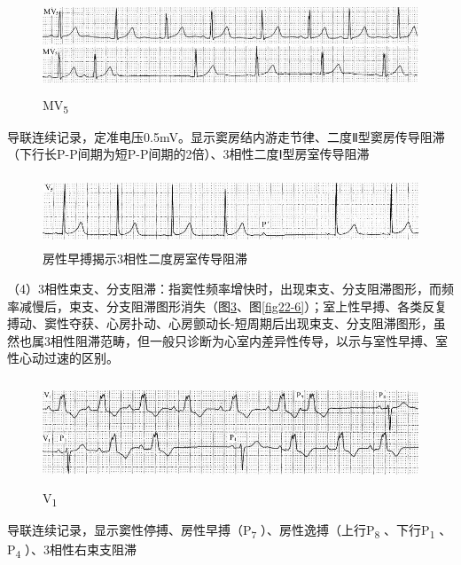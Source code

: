 \begin{figure}[!htbp]
 \centering
 \includegraphics[width=5.58333in,height=1.11458in]{./images/Image00368.jpg}
 \captionsetup{justification=centering}
 \caption{MV\textsubscript{5}}
 \label{fig22-3}
  \end{figure} 
导联连续记录，定准电压0.5mV。显示窦房结内游走节律、二度Ⅱ型窦房传导阻滞（下行长P-P间期为短P-P间期的2倍）、3相性二度Ⅰ型房室传导阻滞

\begin{figure}[!htbp]
 \centering
 \includegraphics[width=5.58333in,height=0.83333in]{./images/Image00369.jpg}
 \captionsetup{justification=centering}
 \caption{房性早搏揭示3相性二度房室传导阻滞}
 \label{fig22-4}
  \end{figure} 

（4）3相性束支、分支阻滞：指窦性频率增快时，出现束支、分支阻滞图形，而频率减慢后，束支、分支阻滞图形消失（图\ref{fig22-5}、图\ref{fig22-6}）；室上性早搏、各类反复搏动、窦性夺获、心房扑动、心房颤动长-短周期后出现束支、分支阻滞图形，虽然也属3相性阻滞范畴，但一般只诊断为心室内差异性传导，以示与室性早搏、室性心动过速的区别。

\begin{figure}[!htbp]
 \centering
 \includegraphics[width=5.58333in,height=1.23958in]{./images/Image00370.jpg}
 \captionsetup{justification=centering}
 \caption{V\textsubscript{1}}
 \label{fig22-5}
  \end{figure} 
导联连续记录，显示窦性停搏、房性早搏（P\textsubscript{7}
）、房性逸搏（上行P\textsubscript{8} 、下行P\textsubscript{1}
、P\textsubscript{4} ）、3相性右束支阻滞

